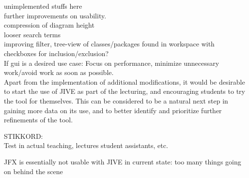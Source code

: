 unimplemented stuffs here\\
further improvements on usability.\\
compression of diagram height\\
looser search terms\\
improving filter, tree-view of classes/packages found in workspace with checkboxes for inclusion/exclusion?\\
If gui is a desired use case: Focus on performance, minimize unnecessary work/avoid work as soon as possible.\\


Apart from the implementation of additional modifications, it would be desirable to start the use of JIVE as part of the lecturing, and encouraging students to try the tool for themselves.
This can be considered to be a natural next step in gaining more data on its use, and to better identify and prioritize further refinements of the tool.


STIKKORD:\\
Test in actual teaching, lectures student assistants, etc.

JFX is essentially not usable with JIVE in current state: too many things going on behind the scene\\



